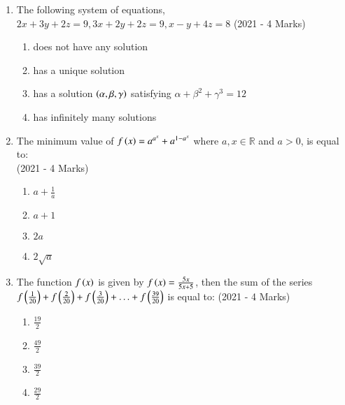 \documentclass[journal]{IEEEtran}
\begin{document}
\begin{enumerate}
{        }
    \item{
        	The following system of equations,
            $
            	2x + 3y + 2z = 9 ,
            	3x + 2y + 2z = 9 ,
            	x - y + 4z = 8
            $
             \text{   }\hfill
                {(2021 - 4 Marks)}

                \begin{enumerate}
                   	\item does not have any solution 
                   	\item has a unique solution 
                   	\item has a solution $\left(\alpha, \beta, \gamma\right)$ satisfying $\alpha + \beta^2 + \gamma^3 = 12$ 
                   	\item has infinitely many solutions
                \end{enumerate}

        
        }
    \item{
	
			The minimum value of
			$ f\left(x\right) = a^{a^{x}} + a^{1-a^{x}}$
			where $a, x \in \mathbb{R}$ and $a > 0$, is equal to:\\
			\text{   }\hfill
			{(2021 - 4 Marks)}
			\begin{multicols}{4}
				\begin{enumerate}
						\item $a + \frac{1}{a}$
						\item $a + 1$
						\item $2a$
						\item $2\sqrt{a}$
				\end{enumerate}
			\end{multicols}
			
		}
    \item{
	
			The function \( f\left(x\right) \) is given by \( f\left(x\right) = \frac{5x}{5x+5} \), then the sum of the series \( f\left(\frac{1}{20}\right) + f\left(\frac{2}{20}\right) + f\left(\frac{3}{20}\right) + \ldots + f\left(\frac{39}{20}\right) \) is equal to:
			\text{   }\hfill
			{(2021 - 4 Marks)}
			\begin{multicols}{4}
				\begin{enumerate}
					\item $\frac{19}{2}$
					\item $\frac{49}{2}$
					\item $\frac{39}{2}$
					\item $\frac{29}{2}$
				\end{enumerate}
			\end{multicols}
			
}
\end{enumerate}
\end{document}
